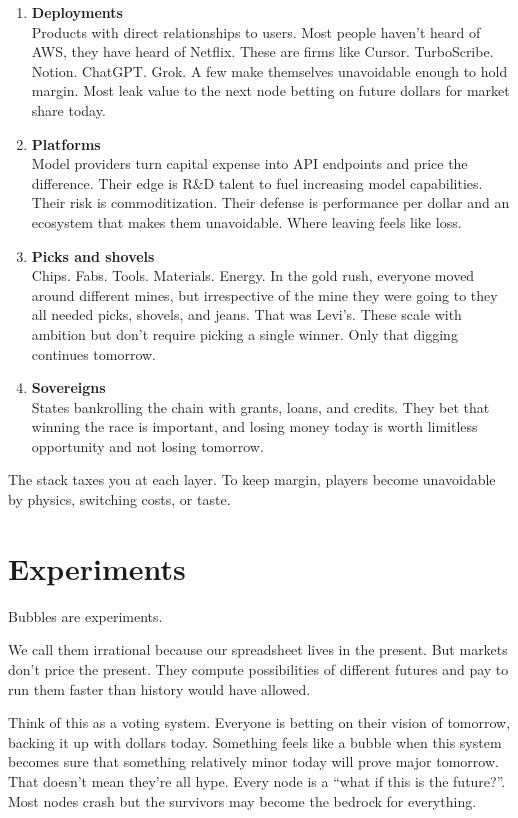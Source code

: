 \documentclass[12pt,letterpaper]{article}
\begin{document}
\begin{enumerate}[label=\textbf{\arabic*.}]
    \item \textbf{Deployments}\\
    Products with direct relationships to users. Most people haven't heard of AWS, they have heard of Netflix. These are firms like Cursor. TurboScribe. Notion. ChatGPT. Grok. A few make themselves unavoidable enough to hold margin. Most leak value to the next node betting on future dollars for market share today.

    \item \textbf{Platforms}\\
    Model providers turn capital expense into API endpoints and price the difference. Their edge is R\&D talent to fuel increasing model capabilities. Their risk is commoditization. Their defense is performance per dollar and an ecosystem that makes them unavoidable. Where leaving feels like loss.

    \item \textbf{Picks and shovels}\\
    Chips. Fabs. Tools. Materials. Energy. In the gold rush, everyone moved around different mines, but irrespective of the mine they were going to they all needed picks, shovels, and jeans. That was Levi's. These scale with ambition but don't require picking a single winner. Only that digging continues tomorrow.

    \item \textbf{Sovereigns}\\
    States bankrolling the chain with grants, loans, and credits. They bet that winning the race is important, and losing money today is worth limitless opportunity and not losing tomorrow.
\end{enumerate}

The stack taxes you at each layer. To keep margin, players become unavoidable by physics, switching costs, or taste.

\section{Experiments}

Bubbles are experiments.

We call them irrational because our spreadsheet lives in the present. But markets don't price the present. They compute possibilities of different futures and pay to run them faster than history would have allowed.

Think of this as a voting system. Everyone is betting on their vision of tomorrow, backing it up with dollars today. Something feels like a bubble when this system becomes sure that something relatively minor today will prove major tomorrow. That doesn't mean they're all hype. Every node is a ``what if this is the future?''. Most nodes crash but the survivors may become the bedrock for everything.
\end{document}
